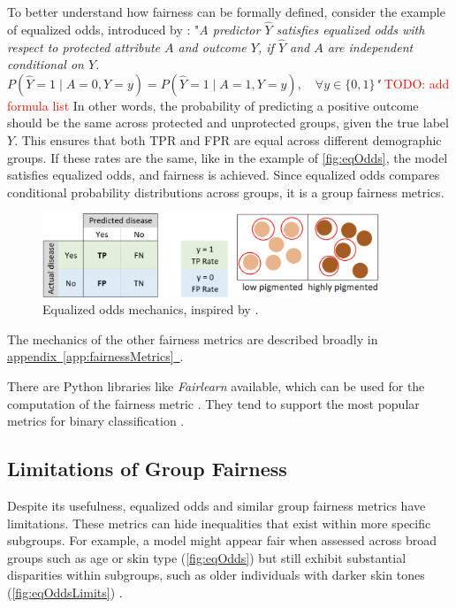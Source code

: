 \documentclass[12pt, a4paper, oneside]{book}   	%
\renewcommand{\todo}[1]{\textcolor{red}{TODO: #1}}
\newcommand{\linkapp}[1]{\hyperref[#1]{appendix~\ref{#1}~\nameref{#1}}}
\begin{document}
		To better understand how fairness can be formally defined, consider the example of equalized odds, introduced by \textcite{M63_Hardt_2016}: \newline
		"\textit{A predictor $\hat{Y}$ satisfies equalized odds with respect to protected attribute $A$ and outcome $Y$, if $\hat{Y}$ and $A$ are independent conditional on $Y$. \newline
			\(
			P(\hat{Y} = 1 \mid A = 0, Y = y) = P(\hat{Y} = 1 \mid A = 1, Y = y), \quad \forall y \in \{0, 1\}
			\)"} \todo{add formula list} \newline
		In other words, the probability of predicting a positive outcome should be the same across protected and unprotected groups, given the true label $Y$. This ensures that both \gls{TPR} and \gls{FPR} are equal across different demographic groups. If these rates are the same, like in the example of \autoref{fig:eqOdds}, the model satisfies equalized odds, and fairness is achieved. Since equalized odds compares conditional probability distributions across groups, it is a group fairness metrics.
		
		\begin{figure}[H]
			\centering
			\includegraphics[width=0.9\textwidth]{figures/EqualizedOddsIllustration.png}
			\caption{Equalized odds mechanics, inspired by \textcite{M80_Kearns_2019}.}
			\label{fig:eqOdds}
		\end{figure}
		
		The mechanics of the other fairness metrics are described broadly in \linkapp{app:fairnessMetrics}.
		
		There are Python libraries like \textit{\gls{Fairlearn}} available, which can be used for the computation of the fairness metric \autocite{Agarwal_2018}. They tend to support the most popular metrics for binary classification \autocite{Fairlearn_nodate}.
		
		\subsection{Limitations of Group Fairness}
		
		Despite its usefulness, equalized odds and similar group fairness metrics have limitations. These metrics can hide inequalities that exist within more specific subgroups. For example, a model might appear fair when assessed across broad groups such as age or skin type (\autoref{fig:eqOdds}) but still exhibit substantial disparities within subgroups, such as older individuals with darker skin tones (\autoref{fig:eqOddsLimits}) \autocite{M79_Kearns_2018,M80_Kearns_2019}.
		
\end{document}
